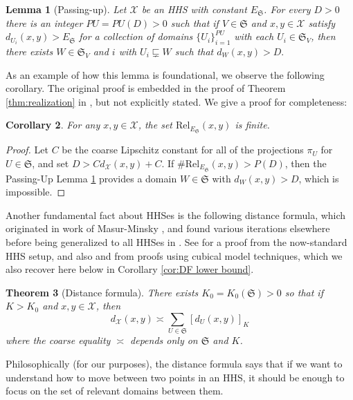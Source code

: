 \documentclass{amsart}
\newtheorem{theorem}{Theorem}[section]
\newtheorem{corollary}[theorem]{Corollary}
\newtheorem{lemma}[theorem]{Lemma}
\theoremstyle{definition}
\theoremstyle{remark}
\theoremstyle{definition}
\newcommand{\calX}{\mathcal{X}}
\newcommand{\ES}{E_{\mathfrak S}}
\newcommand{\Rel}{\mathrm{Rel}}
\begin{document}
\begin{lemma}[Passing-up]\label{lem:passing-up}
Let $\calX$ be an HHS with constant $\ES$.  For every $D>0$ there is an integer $PU=PU(D)>0$ such that if $V \in \mathfrak S$ and $x,y \in \calX$ satisfy $d_{U_i}(x,y)>\ES$ for a collection of domains $\{U_i\}_{i=1}^{PU}$ with each $U_i \in \mathfrak S_V$, then there exists $W \in \mathfrak S_V$ and $i$ with $U_i \sqsubsetneq W$ such that $d_W(x,y)>D.$
\end{lemma}

As an example of how this lemma is foundational, we observe the following corollary.  The original proof is embedded in the proof of Theorem \ref{thm:realization} in \cite[Theorem 3.1]{HHS_II}, but not explicitly stated.  We give a proof for completeness:

\begin{corollary}\label{cor:rel sets are finite}
For any $x,y \in \calX$, the set $\Rel_{\ES}(x,y)$ is finite.
\end{corollary}

\begin{proof}
Let $C$ be the coarse Lipschitz constant for all of the projections $\pi_U$ for $U \in \mathfrak S$, and set $D > C d_{\calX}(x,y) + C$.  If $\# \Rel_{\ES}(x,y) > P(D)$, then the Passing-Up Lemma \ref{lem:passing-up} provides a domain $W \in \mathfrak S$ with $d_W(x,y)>D$, which is impossible.
\end{proof}

Another fundamental fact about HHSes is the following distance formula, which originated in work of Masur-Minsky \cite{MM00}, and found various iterations elsewhere \cite{Brock, Rafi:combo, Dur:augmented, kim2014geometry} before being generalized to all HHSes in \cite{HHS_II}.  See \cite[Theorem 4.5]{HHS_II} for a proof from the now-standard HHS setup, and also \cite[Theorem 1.2]{Bowditch_hulls} and \cite[Corollary C]{Dur_infcube} from proofs using cubical model techniques, which we also recover here below in Corollary \ref{cor:DF lower bound}.

\begin{theorem}[Distance formula]\label{thm:DF}
There exists $K_0 = K_0(\mathfrak S)>0$ so that if $K>K_0$ and $x,y \in \calX$, then
$$d_{\calX}(x,y) \asymp \sum_{U \in \mathfrak S} [d_U(x,y)]_K$$
where the coarse equality $\asymp$ depends only on $\mathfrak S$ and $K$.
\end{theorem}

Philosophically (for our purposes), the distance formula says that if we want to understand how to move between two points in an HHS, it should be enough to focus on the set of relevant domains between them. 
\end{document}
